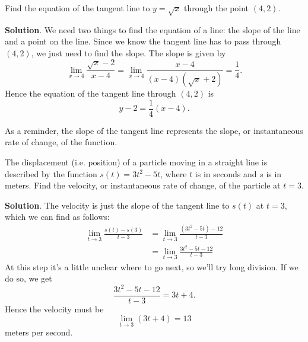 \documentclass[10pt,]{book}
\theoremstyle{ptxplainnotitle}
\theoremstyle{ptxplaintitle}
\theoremstyle{ptxplainnotitle}
\theoremstyle{ptxplaintitle}
\theoremstyle{ptxplainnotitle}
\theoremstyle{ptxplaintitle}
\theoremstyle{ptxdefinitionnotitle}
\theoremstyle{ptxdefinitiontitle}
\theoremstyle{ptxdefinitionnotitle}
\theoremstyle{ptxdefinitiontitle}
\theoremstyle{ptxdefinitionnotitle}
\theoremstyle{ptxdefinitiontitle}
\theoremstyle{ptxdefinitionnotitle}
\theoremstyle{ptxdefinitiontitle}
\theoremstyle{ptxdefinitionnotitle}
\theoremstyle{ptxdefinitiontitle}
\numberwithin{equation}{section}
\begin{document}
\begin{example}\label{example-tangent-line-to-a-root}
\hypertarget{p-80}{}%
Find the equation of the tangent line to \(y=\sqrt{x}\) through the point \((4,2)\).%
\par\smallskip%
\noindent\textbf{Solution}.\hypertarget{solution-17}{}\quad%
\hypertarget{p-81}{}%
We need two things to find the equation of a line: the slope of the line and a point on the line. Since we know the tangent line has to pass through \((4,2)\), we just need to find the slope. The slope is given by%
\begin{equation*}
\lim_{x\to 4}\frac{\sqrt{x}-2}{x-4} = \lim_{x\to4}\frac{x-4}{(x-4)(\sqrt{x}+2)} = \frac{1}{4}.
\end{equation*}
Hence the equation of the tangent line through \((4,2)\) is%
\begin{equation*}
y-2 = \frac{1}{4}(x-4).
\end{equation*}
%
\end{example}
\hypertarget{p-82}{}%
As a reminder, the slope of the tangent line represents the slope, or instantaneous rate of change, of the function.%
\begin{example}\label{example-velocity-from-position}
\hypertarget{p-83}{}%
The displacement (i.e. position) of a particle moving in a straight line is described by the function \(s(t) = 3t^{2} - 5t\), where \(t\) is in seconds and \(s\) is in meters. Find the velocity, or instantaneous rate of change, of the particle at \(t=3\).%
\par\smallskip%
\noindent\textbf{Solution}.\hypertarget{solution-18}{}\quad%
\hypertarget{p-84}{}%
The velocity is just the slope of the tangent line to \(s(t)\) at \(t=3\), which we can find as follows:%
%
\begin{align*}
\lim_{t\to3}\frac{s(t) - s(3)}{t-3} & = \lim_{t\to3}\frac{(3t^{2} - 5t) - 12}{t-3} \\
& = \lim_{t\to3}\frac{3t^{2} - 5t - 12}{t-3} 
\end{align*}
\hypertarget{p-85}{}%
At this step it's a little unclear where to go next, so we'll try long division. If we do so, we get%
\begin{equation*}
\frac{3t^{2} - 5t - 12}{t-3} = 3t+4.
\end{equation*}
Hence the velocity must be%
\begin{equation*}
\lim_{t\to3}(3t+4) = 13
\end{equation*}
meters per second.%
\end{example}
\end{document}
